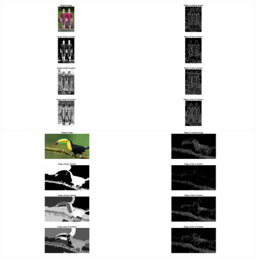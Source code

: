 \documentclass[11pt]{article}
\begin{document}
\begin{itemize}
        \includegraphics[width=\textwidth]{Output Pictures/twins_kmeans}\newline
        \includegraphics[width=\textwidth]{Output Pictures/toucan_kmeans}\newline
    \end{itemize}
\end{document}
